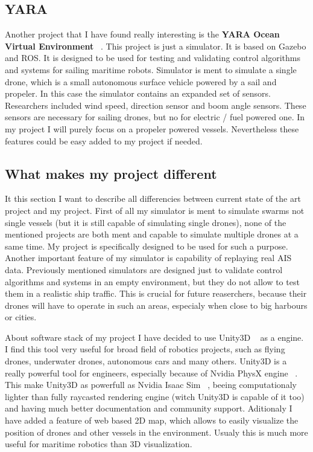 \vspace{0.5cm}
\subsection{YARA}
Another project that I have found really interesting is the \textbf{YARA Ocean Virtual Environment} ~\cite{YARA}. This project is just a simulator. It is based on Gazebo and ROS. It is designed to be used for testing and validating control algorithms and systems for sailing maritime robots. Simulator is ment to simulate a single drone, which is a small autonomous surface vehicle powered by a sail and propeler. In this case the simulator contains an expanded set of sensors. Researchers included wind speed, direction sensor and boom angle sensors. These sensors are necessary for sailing drones, but no for electric / fuel powered one. In my project I will purely focus on a propeler powered vessels. Nevertheless these features could be easy added to my project if needed.



\vspace{0.5cm}
\subsection{What makes my project different}
It this section I want to describe all differencies between current state of the art project and my project. First of all my simulator is ment to simulate swarms not single vessels (but it is still capable of simulating single drones), none of the mentioned projects are both ment and capable to simulate multiple drones at a same time. My project is specifically designed to be used for such a purpose. Another important feature of my simulator is capability of replaying real AIS data. Previously mentioned simulators are designed just to validate control algorithms and systems in an empty environment, but they do not allow to test them in a realistic ship traffic. This is crucial for future reaserchers, because their drones will have to operate in such an areas, especialy when close to big harbours or cities. 

About software stack of my project I have decided to use Unity3D ~\cite{Unity3D} as a engine. I find this tool very useful for broad field of robotics projects, such as flying drones, underwater drones, autonomous cars and many others. Unity3D is a really powerful tool for engineers, especially because of Nvidia PhysX engine ~\cite{NvidiaPhysX}. This make Unity3D as powerfull as Nvidia Isaac Sim ~\cite{NvidiaIsaacSim}, beeing computationaly lighter than fully raycasted rendering engine (witch Unity3D is capable of it too) and having much better documentation and community support. Aditionaly I have added a feature of web based 2D map, which allows to easily visualize the position of drones and other vessels in the environment. Usualy this is much more useful for maritime robotics than 3D visualization. 

